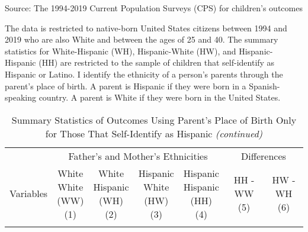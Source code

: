 
\begin{landscape}
\begin{ThreePartTable}
\begin{TableNotes}
\item[1] Source: The 1994-2019 Current Population Surveys (CPS) for children's outcomes
\item[2] The data is restricted to native-born United States citizens between 1994 and 2019 who are also White and between the ages of 25 and 40. The summary statistics for White-Hispanic (WH), Hispanic-White (HW), and Hispanic-Hispanic (HH) are restricted to the sample of children that self-identify as Hispanic or Latino. I identify the ethnicity of a person's parents through the parent's place of birth. A parent is Hispanic if they were born in a Spanish-speaking country. A parent is White if they were born in the United States.
\end{TableNotes}
\begin{longtable}[t]{>{\raggedright\arraybackslash}p{5cm}cccccc}
\caption{Summary Statistics of Outcomes Using Parent's Place of Birth Only for Those That Self-Identify as Hispanic \label{tab:c&p2}}\\
\toprule
\multicolumn{1}{c}{ } & \multicolumn{4}{c}{Father's and Mother's Ethnicities} & \multicolumn{2}{c}{Differences} \\
\cmidrule(l{3pt}r{3pt}){2-5} \cmidrule(l{3pt}r{3pt}){6-7}
Variables & \specialcell{White \\ White \\ (WW) \\ (1)} & \specialcell{White \\ Hispanic \\ (WH) \\ (2)} & \specialcell{Hispanic \\ White \\ (HW) \\ (3)} & \specialcell{Hispanic \\ Hispanic \\ (HH) \\ (4)} & \specialcell{HH - WW \\ (5)} & \specialcell{HW - WH \\ (6)}\\
\midrule
\endfirsthead
\caption[]{Summary Statistics of Outcomes Using Parent's Place of Birth Only for Those That Self-Identify as Hispanic  \textit{(continued)}}\\
\toprule

\end{longtable}
\end{ThreePartTable}
\end{landscape}
